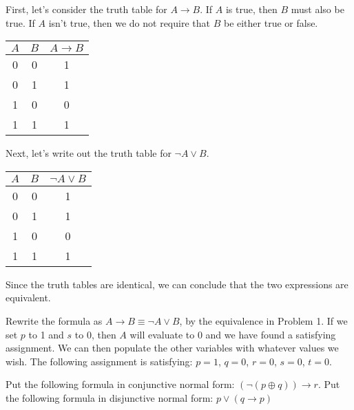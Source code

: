 \documentclass[solution, letterpaper]{cs20}
\begin{document}
        \begin{solution}

        \subsolution
          First, let's consider the truth table for $A \rightarrow B$. If $A$ is true, then $B$ must also be true. If $A$ isn't true, then we do not require that $B$ be either true or false.
          \begin{center}
            \begin{tabular}{|c|c|c|}\hline
              $A$ & $B$ & $A \rightarrow B$ \\\hline
              0 & 0 & 1 \\
              0 & 1 & 1 \\
              1 & 0 & 0 \\
              1 & 1 & 1 \\\hline
            \end{tabular}
          \end{center}

          Next, let's write out the truth table for $\lnot A \lor B$.
          \begin{center}
            \begin{tabular}{|c|c|c|}\hline
              $A$ & $B$ & $\lnot A \lor B$ \\\hline
              0 & 0 & 1 \\
              0 & 1 & 1 \\
              1 & 0 & 0 \\
              1 & 1 & 1 \\\hline
            \end{tabular}
          \end{center}

          Since the truth tables are identical, we can conclude that the two expressions are equivalent.

        \subsolution Rewrite the formula as $A \rightarrow B \equiv \lnot A \lor B$, by the equivalence in Problem 1. If we set $p$ to 1 and $s$ to 0, then $A$ will evaluate to 0 and we have found a satisfying assignment. We can then populate the other variables with whatever values we wish. The following assignment is satisfying: $p = 1$, $q = 0$, $r = 0$, $s = 0$, $t = 0$.

        \end{solution}


        \subproblem Put the following formula in conjunctive normal form: $(\lnot (p \oplus q)) \rightarrow r$.
        \subproblem Put the following formula in disjunctive normal form: $p \lor (q \rightarrow p)$
\end{document}
